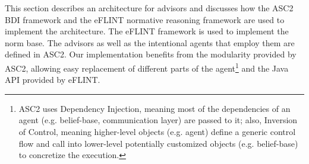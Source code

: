 This section describes an architecture for advisors and discusses how the ASC2 BDI framework and the eFLINT normative reasoning framework are used to implement the architecture.
%
%
The eFLINT framework is used to implement the norm base.
%
The advisors as well as the intentional agents that employ them are defined in ASC2.
%
Our implementation benefits from the modularity provided by ASC2, allowing easy replacement of different parts of the agent\footnote{ASC2 uses Dependency Injection, meaning most of the dependencies of an agent (e.g. belief-base, communication layer) are passed to it; also, Inversion of Control, meaning higher-level objects (e.g. agent) define a generic control flow and call into lower-level potentially customized objects (e.g. belief-base) to concretize the execution.} and the Java API provided by eFLINT.
%

